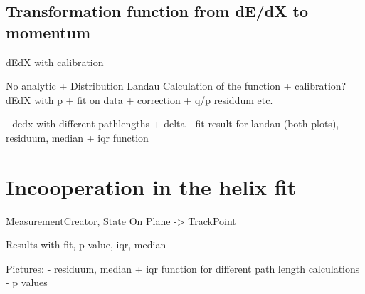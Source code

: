 \subsection{Transformation function from dE/dX to momentum}

dEdX with calibration

No analytic + Distribution
Landau
Calculation of the function + calibration?
dEdX with p + fit on data + correction + q/p residdum etc.

- dedx with different pathlengths + delta
- fit result for landau (both plots),
- residuum, median + iqr function

\section{Incooperation in the helix fit}

MeasurementCreator, State On Plane -> TrackPoint

Results with fit, p value, iqr, median

Pictures:
- residuum, median + iqr function for different path length calculations
- p values